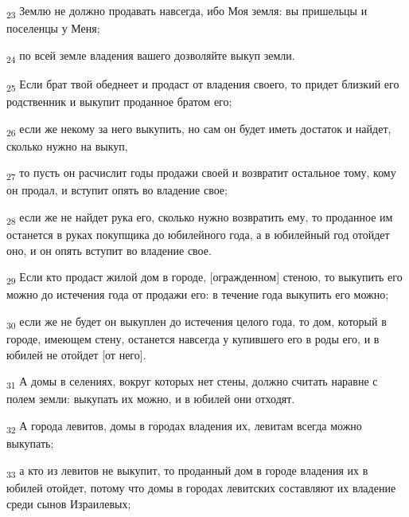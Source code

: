 \begin{tcolorbox}
\textsubscript{23} Землю не должно продавать навсегда, ибо Моя земля: вы пришельцы и поселенцы у Меня;
\end{tcolorbox}
\begin{tcolorbox}
\textsubscript{24} по всей земле владения вашего дозволяйте выкуп земли.
\end{tcolorbox}
\begin{tcolorbox}
\textsubscript{25} Если брат твой обеднеет и продаст от владения своего, то придет близкий его родственник и выкупит проданное братом его;
\end{tcolorbox}
\begin{tcolorbox}
\textsubscript{26} если же некому за него выкупить, но сам он будет иметь достаток и найдет, сколько нужно на выкуп,
\end{tcolorbox}
\begin{tcolorbox}
\textsubscript{27} то пусть он расчислит годы продажи своей и возвратит остальное тому, кому он продал, и вступит опять во владение свое;
\end{tcolorbox}
\begin{tcolorbox}
\textsubscript{28} если же не найдет рука его, сколько нужно возвратить ему, то проданное им останется в руках покупщика до юбилейного года, а в юбилейный год отойдет оно, и он опять вступит во владение свое.
\end{tcolorbox}
\begin{tcolorbox}
\textsubscript{29} Если кто продаст жилой дом в городе, [огражденном] стеною, то выкупить его можно до истечения года от продажи его: в течение года выкупить его можно;
\end{tcolorbox}
\begin{tcolorbox}
\textsubscript{30} если же не будет он выкуплен до истечения целого года, то дом, который в городе, имеющем стену, останется навсегда у купившего его в роды его, и в юбилей не отойдет [от него].
\end{tcolorbox}
\begin{tcolorbox}
\textsubscript{31} А домы в селениях, вокруг которых нет стены, должно считать наравне с полем земли: выкупать их можно, и в юбилей они отходят.
\end{tcolorbox}
\begin{tcolorbox}
\textsubscript{32} А города левитов, домы в городах владения их, левитам всегда можно выкупать;
\end{tcolorbox}
\begin{tcolorbox}
\textsubscript{33} а кто из левитов не выкупит, то проданный дом в городе владения их в юбилей отойдет, потому что домы в городах левитских составляют их владение среди сынов Израилевых;
\end{tcolorbox}

